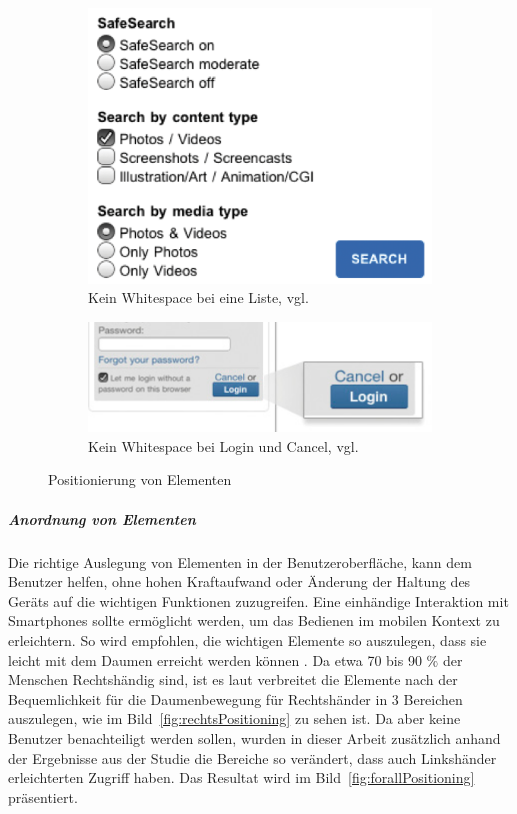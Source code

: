 \begin{figure}
	\centering
	\begin{subfigure}[b]{0.3\textwidth}
		\centering
		\includegraphics[width=1\textwidth]{img/login.png}
		\caption{Kein Whitespace bei eine Liste, vgl. \cite{mobileFirst}}
		\label{fig:login}
	\end{subfigure}
	\begin{subfigure}[b]{0.6\textwidth}
		\centering
			\includegraphics[width=1\textwidth]{img/cancel.png}
	\caption{Kein Whitespace bei Login und Cancel, vgl. \cite{mobileFirst}}\label{fig:cancel}
	\end{subfigure}
	\caption{Positionierung von Elementen}\label{fig:elementPos}
\end{figure}
\subparagraph{Anordnung von Elementen} 
\label{subp:anordnung_von_elementen}

Die richtige Auslegung von Elementen in der Benutzeroberfläche, kann dem Benutzer helfen, ohne hohen Kraftaufwand oder Änderung der Haltung des Geräts auf die wichtigen Funktionen zuzugreifen. Eine einhändige Interaktion mit Smartphones sollte ermöglicht werden, um das Bedienen im mobilen Kontext zu erleichtern. So wird empfohlen, die wichtigen Elemente so auszulegen, dass sie leicht mit dem Daumen erreicht werden können \cite[Seite 209]{mobileFrontier}. Da etwa 70 bis 90 $\%$ der Menschen Rechtshändig sind, ist es laut \cite[Seite 72]{mobileFirst} verbreitet die Elemente nach der Bequemlichkeit für die Daumenbewegung für Rechtshänder in 3 Bereichen auszulegen, wie im Bild~\ref{fig:rechtsPositioning} zu sehen ist. Da aber keine Benutzer benachteiligt werden sollen, wurden in dieser Arbeit zusätzlich anhand der Ergebnisse aus der Studie \cite{Park:2010tu} die Bereiche so verändert, dass auch Linkshänder erleichterten Zugriff haben. Das  Resultat wird im Bild~\ref{fig:forallPositioning}\cite[Seite 72]{mobileFirst} präsentiert.

